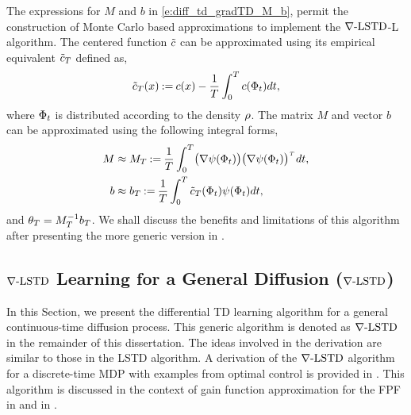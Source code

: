 The expressions for $M$ and $b$ in \eqref{e:diff_td_gradTD_M_b}, permit the construction of Monte Carlo based approximations to implement the $\nabla\text{-LSTD}$-L algorithm. The centered function $\tilde c$ can be approximated using its empirical equivalent $\tilde c_T$ defined as,
\begin{equation}
\tilde c_T(x) \mathbin{:=} c(x) - \frac{1}{T} \int_0^T c(\Phi_t) dt,
\end{equation}
where $\Phi_t$ is distributed according to the density $\rho$. The matrix $M$ and vector $b$ can be approximated using the following integral forms,
\begin{align}
M &\approx M_T \eqdef \frac{1}{T}\int_0^T\bigl(\gradbasis (\markovstate_t)\bigr)\bigl(\gradbasis (\markovstate_t)\bigr)^{\transpose}\, dt, \\
b &\approx b_T \eqdef \frac{1}{T} \int_0^T \tilc_T(\markovstate_t) \basis(\markovstate_t) dt,
\label{e:diff_td_gradTD_M_b_int}
\end{align}
and $\theta_T = M_T^{-1} b_T$. 
We shall discuss the benefits and limitations of this algorithm after presenting the more generic version in . 

\subsection{$\nabla\text{-LSTD}$ Learning for a General Diffusion ($\nabla\text{-LSTD}$)}
\label{s:diff_td_learning}
In this Section, we present the differential TD learning algorithm for a general continuous-time diffusion process. This generic algorithm is denoted as $\nabla\text{-LSTD}$ in the remainder of this dissertation.
The ideas involved in the derivation are similar to those in the LSTD algorithm.  A derivation of the $\nabla\text{-LSTD}$ algorithm for a discrete-time MDP with examples from optimal control is provided in \cite{devmey16arXiv}. This algorithm is discussed in the context of gain function approximation for the FPF in  and in \cite{raddevmey16}. 

